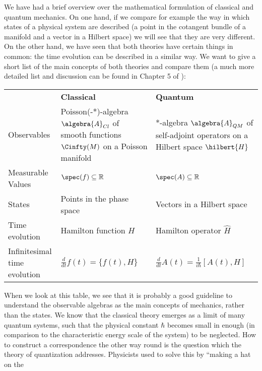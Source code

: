 We have had a brief overview over the mathematical formulation of classical and 
quantum mechanics. On one hand, if we compare for example the way in which states 
of a physical system are described (a point in the cotangent bundle of a manifold 
and a vector in a Hilbert space) we will see that they are very different. On the 
other hand, we have seen that both theories have certain things in common: the 
time evolution can be described in a similar way. We want to give a short list of 
the main concepts of both theories and compare them (a much more detailed list and 
discussion can be found in Chapter 5 of \cite{waldmann:2007a}):
\bgroup
\renewcommand{\arraystretch}{1.6}
\begin{center}
	\begin{tabular}
	{lll}
		~ 
		&
		\textbf{Classical} 
		&
		\textbf{Quantum}
		\\
		\parbox{4cm}
		{
			Observables
		}
		&
		\parbox{5cm}{
			Poisson(-*)-algebra $\algebra{A}_{Cl}$
			of \\
			smooth functions $\Cinfty(M)$ \\
			on a Poisson manifold
		}
		&
		\parbox{5cm}{
			*-algebra $\algebra{A}_{QM}$
			of self-adjoint operators
			on a Hilbert space $\hilbert{H}$
		}
		\\
		\parbox{4cm}
		{
			Measurable 
			Values
		}
		&
		$\spec (f) \subseteq \mathbb{R}$
		&
		$\spec (A) \subseteq \mathbb{R}$
		\\
		States
		&
		\parbox{5cm}{
			Points in the
			phase space
		}
		&
		\parbox{5cm}{
			Vectors in a
			Hilbert space
		}
		\\
		Time evolution
		&
		Hamilton function $H$
		&
		Hamilton operator $\hat{H}$
		\\
		\parbox{4cm}{
			Infinitesimal\\
			time evolution
		}
		&
		$
		\frac{d}{dt} f(t)
		=
		\{f(t), H\}
		$
		&
		$\frac{d}{dt} A(t)
		=
		\frac{1}{i \hbar}
		[A(t), H]
		$
	\end{tabular} 
\end{center}
\egroup
When we look at this table, we see that it is probably a good guideline to 
understand the observable algebras as the main concepts of mechanics, rather than 
the states. We know that the classical theory emerges as a limit of many quantum 
systems, such that the physical constant $\hbar$ becomes small in enough (in 
comparison to the characteristic energy scale of the system) to be neglected. How 
to construct a correspondence the other way round is the question which the theory 
of quantization addresses. Physicists used to solve this by ``making a hat on the 
